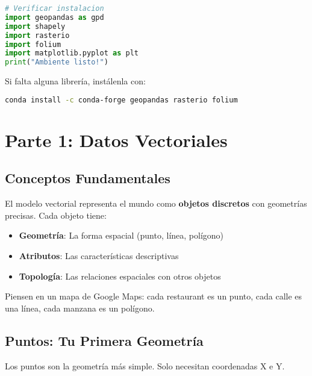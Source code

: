 \documentclass[11pt,a4paper]{article}
\newcommand{\concepto}[2]{\begin{tcolorbox}[colback=blue!5,colframe=usachblue,title={#1}]#2\end{tcolorbox}}
\begin{document}
\begin{lstlisting}[language=Python]
# Verificar instalacion
import geopandas as gpd
import shapely
import rasterio
import folium
import matplotlib.pyplot as plt
print("Ambiente listo!")
\end{lstlisting}

Si falta alguna librería, instálenla con:
\begin{lstlisting}[language=bash]
conda install -c conda-forge geopandas rasterio folium
\end{lstlisting}

\newpage

\section{Parte 1: Datos Vectoriales}

\subsection{Conceptos Fundamentales}

\concepto{Modelo Vectorial}{
El modelo vectorial representa el mundo como \textbf{objetos discretos} con geometrías precisas. Cada objeto tiene:
\begin{itemize}
    \item \textbf{Geometría}: La forma espacial (punto, línea, polígono)
    \item \textbf{Atributos}: Las características descriptivas
    \item \textbf{Topología}: Las relaciones espaciales con otros objetos
\end{itemize}

Piensen en un mapa de Google Maps: cada restaurant es un punto, cada calle es una línea, cada manzana es un polígono.
}

\subsection{Puntos: Tu Primera Geometría}

Los puntos son la geometría más simple. Solo necesitan coordenadas X e Y.
\end{document}
